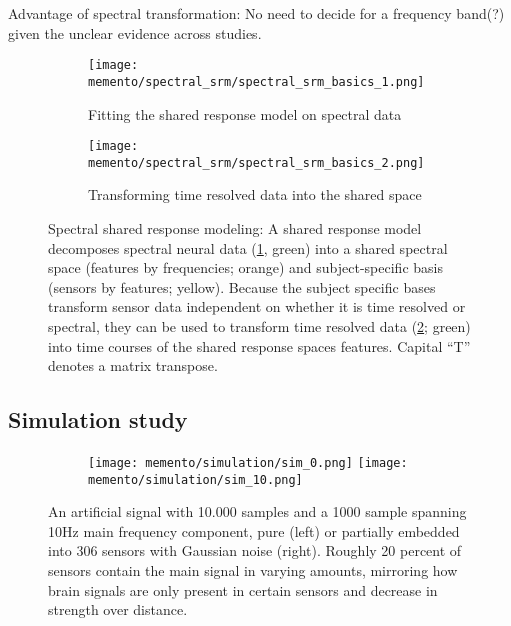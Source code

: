 Advantage of spectral transformation: No need to decide for a frequency band(?) given the unclear evidence across studies.

\begin{figure}
	\centering
	\begin{subfigure}{0.9\textwidth}
		\texttt{[image: memento/spectral\_srm/spectral\_srm\_basics\_1.png]}
		\caption{Fitting the shared response model on spectral data}
		\label{fig:spectral-srm1}
	\end{subfigure}
	\begin{subfigure}{0.9\textwidth}
		\texttt{[image: memento/spectral\_srm/spectral\_srm\_basics\_2.png]}
		\caption{Transforming time resolved data into the shared space}
		\label{fig:spectral-srm2}
	\end{subfigure}
	\caption[Spectral shared response modeling]{Spectral shared response modeling: A shared response model decomposes spectral neural data (\ref{fig:spectral-srm1}, green) into a shared spectral space (features by frequencies; orange) and subject-specific basis (sensors by features; yellow). Because the subject specific bases transform sensor data independent on whether it is time resolved or spectral, they can be used to transform time resolved data (\ref{fig:spectral-srm2}; green) into time courses of the shared response spaces features. Capital ``T'' denotes a matrix transpose.}
	\label{fig:spectral-srm}
\end{figure}

\subsection{Simulation study}


\begin{figure}
	\begin{subfigure}{1.0\textwidth}
		\texttt{[image: memento/simulation/sim\_0.png]}
		\texttt{[image: memento/simulation/sim\_10.png]}
	\end{subfigure}
	\caption{An artificial signal with 10.000 samples and a 1000 sample spanning 10Hz main frequency component, pure (left) or partially embedded into 306 sensors with Gaussian noise (right). Roughly 20 percent of sensors contain the main signal in varying amounts, mirroring how brain signals are only present in certain sensors and decrease in strength over distance.}
	\label{fig:sim_artificial_signal}
\end{figure}

